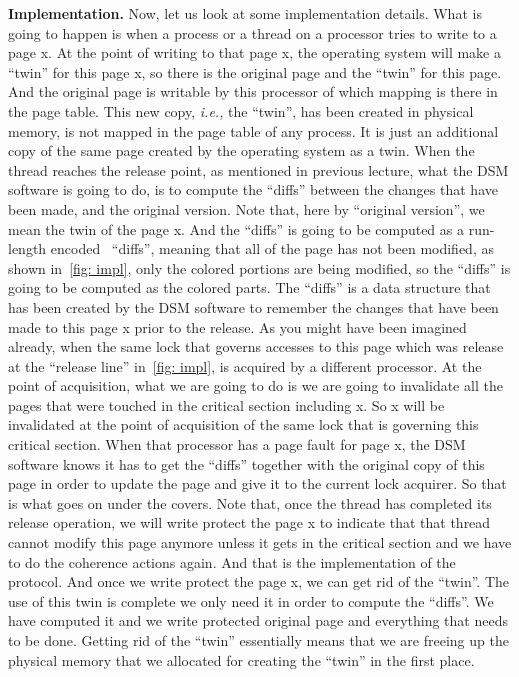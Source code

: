 \documentclass[11pt]{lecture}
\begin{document}
\noindent
{\bf Implementation.} Now, let us look at some implementation details. What is going to happen is 
when a process or a thread on a processor tries to write to a page {\code x}. At the point of 
writing to that page {\code x}, the operating system will make a ``twin'' for this page {\code x}, so 
there is the original page and the ``twin'' for this page. And the original page is writable by 
this processor of which mapping is there in the page table. This new copy, {\it i.e.,} the ``twin'', 
has been created in physical memory, is not mapped in the page table of any process. It is just an additional 
copy of the same page created by the operating system as a twin. When the thread reaches the release point, 
as mentioned in previous lecture, what the DSM software is going to do, is to compute the ``diffs'' between 
the changes that have been made, and the original version. Note that, here by ``original version'', we 
mean the twin of the page {\code x}. And the ``diffs'' is going to be computed as a run-length encoded~\cite{rle} ``diffs'', 
meaning that all of the page has not been modified, as shown in~\autoref{fig: impl}, only the colored portions are being 
modified, so the ``diffs'' is going to be computed as the colored parts. The ``diffs'' is a data structure 
that has been created by the DSM software to remember the changes that have been made to this page {\code x} 
prior to the release. As you might have been imagined already, when the same lock that governs accesses to this 
page which was release at the ``release line'' in~\autoref{fig: impl}, is acquired by a different processor. 
At the point of acquisition, what we are going to do is we are going to invalidate all the pages that 
were touched in the critical section including {\code x}. So {\code x} will be invalidated 
at the point of acquisition of the same lock that is governing this critical section. When that 
processor has a page fault for page {\code x}, the DSM software knows it has to get the ``diffs'' together with 
the original copy of this page in order to update the page and give it to the current lock acquirer. So that 
is what goes on under the covers. Note that, once the thread has completed its release operation, we will 
write protect the page {\code x} to indicate that that thread cannot modify this page anymore unless 
it gets in the critical section and we have to do the coherence actions again. And that is the implementation 
of the protocol. And once we write protect the page {\code x}, we can get rid of the ``twin''. The use of this 
twin is complete we only need it in order to compute the ``diffs''. We have computed it and we write protected 
original page and everything that needs to be done. Getting rid of the ``twin'' essentially means that we are 
freeing up the physical memory that we allocated for creating the ``twin'' in the first place. 
\end{document}
